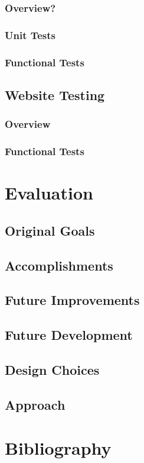 \documentclass[11pt]{article}
\begin{document}
		\subsubsection{Overview?}
		\subsubsection{Unit Tests}
		\subsubsection{Functional Tests}
	\subsection{Website Testing}
		\subsubsection{Overview}
		\subsubsection{Functional Tests}
		
\section{Evaluation}
	\subsection{Original Goals}
	\subsection{Accomplishments}
	\subsection{Future Improvements}
	\subsection{Future Development}
	\subsection{Design Choices}
	\subsection{Approach}
	
\section{Bibliography}
	
\end{document}
